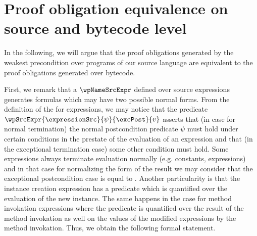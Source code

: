 

\newtheorem{wpExprSrc}{Lemma}[section]
\newtheorem{exprValueOnStack1}[wpExprSrc]{Lemma}
\newtheorem{exprSrcBcWp1}[wpExprSrc]{Lemma}
\newtheorem{exprSrcBcWp2}[wpExprSrc]{Lemma}
\newtheorem{wpStmtBcSrc1}[wpExprSrc]{Lemma}
\newtheorem{wpStmtBcSrc3}[wpExprSrc]{Lemma} %
\newtheorem{wpStmtBcSrc2}[wpExprSrc]{Lemma}
\newtheorem{theorem}{Theorem}[section]


\section{Proof obligation equivalence on source and bytecode level}\label{pogEq:aux}

In the following, we will argue that the proof obligations generated by the weakest precondition
over programs of our source language are equivalent to the  proof obligations generated over bytecode.

First, we remark that a $\wpNameSrcExpr$ defined over source  expressions generates formulas which may
 have two possible normal forms. From the definition of the \wpName{}  for expressions, we may notice that the predicate 
$\wpSrcExpr{\expressionSrc }{ \psi }{ \excPost}{v}$ asserts that  (in case for normal termination) the  normal postcondition
 predicate $\psi $ must hold under certain  conditions in the prestate of the evaluation of an expression and that
 (in the exceptional termination case) some other condition must hold. Some expressions always terminate evaluation normally
 (e.g. constants, \instanceof{} expressions) and in that case for normalizing the form of the \wpName{} result we may consider
that the exceptional postcondition case is equal to \Mytrue. Another particularity is that the instance creation
expression has a \wpName{} predicate which is quantified over the evaluation of the new instance. The same happens in the case
for method invokation expressions where the \wpName{} predicate is quantified over the result of the method invokation 
as well on the values of the modified expressions by the method invokation. 
Thus, we obtain the following formal statement.
 

